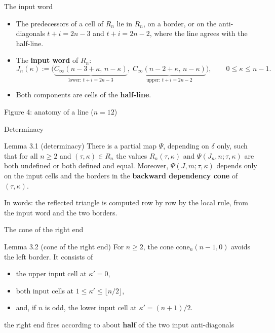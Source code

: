 \begin{frame}{The input word}
\begin{itemize}
\item The predecessors of a cell of $R_n$ lie in $R_n$, on a border, or on the anti-diagonals $t+i=2n-3$ and $t+i=2n-2$, where the line agrees with the half-line.
\item The \textbf{input word} of $R_n$:
\[J_n(\kappa):=\bigl(\underbrace{C_\infty(n-3+\kappa,\,n-\kappa)}_{\text{lower: }t+i=2n-3},\;\underbrace{C_\infty(n-2+\kappa,\,n-\kappa)}_{\text{upper: }t+i=2n-2}\bigr),\qquad 0\le\kappa\le n-1.\]
\item Both components are cells of the \textbf{half-line}.
\end{itemize}
\end{frame}

\begin{frame}{Figure 4: anatomy of a line ($n=12$)}
\centering\fig[0.78]{}
\end{frame}

\begin{frame}{Determinacy}
\begin{statement}{Lemma 3.1 (determinacy)}
There is a partial map $\Psi$, depending on $\delta$ only, such that for all $n\ge2$ and $(\tau,\kappa)\in R_n$ the values $R_n(\tau,\kappa)$ and $\Psi(J_n,n;\tau,\kappa)$ are both undefined or both defined and equal. Moreover, $\Psi(J,m;\tau,\kappa)$ depends only on the input cells and the borders in the \textbf{backward dependency cone} of $(\tau,\kappa)$.
\end{statement}
\vspace{1ex}
In words: the reflected triangle is computed row by row by the local rule, from the input word and the two borders.
\end{frame}

\begin{frame}{The cone of the right end}
\begin{statement}{Lemma 3.2 (cone of the right end)}
For $n\ge2$, the cone $\mathrm{cone}_n(n-1,0)$ avoids the left border. It consists of
\begin{itemize}
\item the upper input cell at $\kappa'=0$,
\item both input cells at $1\le\kappa'\le\lfloor n/2\rfloor$,
\item and, if $n$ is odd, the lower input cell at $\kappa'=(n+1)/2$.
\end{itemize}
\end{statement}
\vspace{1ex}
\begin{center}the right end fires according to about \textbf{half} of the two input anti-diagonals\end{center}
\end{frame}

